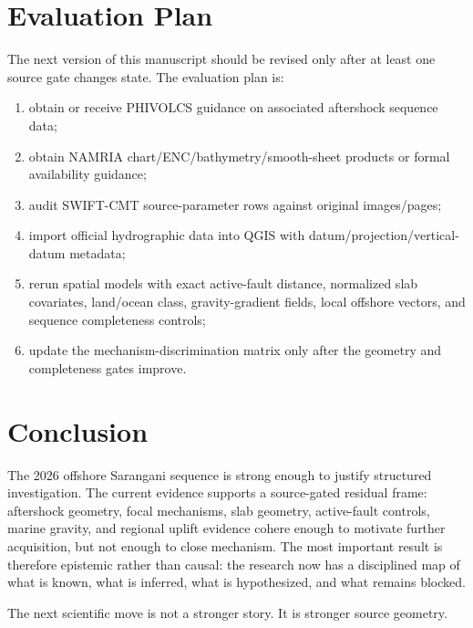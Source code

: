\documentclass[11pt]{article}
\begin{document}
\section{Evaluation Plan}

The next version of this manuscript should be revised only after at least one source gate changes state. The evaluation plan is:
\begin{enumerate}[leftmargin=2em]
  \item obtain or receive PHIVOLCS guidance on associated aftershock sequence data;
  \item obtain NAMRIA chart/ENC/bathymetry/smooth-sheet products or formal availability guidance;
  \item audit SWIFT-CMT source-parameter rows against original images/pages;
  \item import official hydrographic data into QGIS with datum/projection/vertical-datum metadata;
  \item rerun spatial models with exact active-fault distance, normalized slab covariates, land/ocean class, gravity-gradient fields, local offshore vectors, and sequence completeness controls;
  \item update the mechanism-discrimination matrix only after the geometry and completeness gates improve.
\end{enumerate}

\section{Conclusion}

The 2026 offshore Sarangani sequence is strong enough to justify structured investigation. The current evidence supports a source-gated residual frame: aftershock geometry, focal mechanisms, slab geometry, active-fault controls, marine gravity, and regional uplift evidence cohere enough to motivate further acquisition, but not enough to close mechanism. The most important result is therefore epistemic rather than causal: the research now has a disciplined map of what is known, what is inferred, what is hypothesized, and what remains blocked.

The next scientific move is not a stronger story. It is stronger source geometry.
\end{document}
